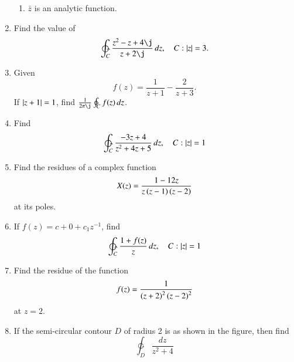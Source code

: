 \documentclass[journal,12pt,twocolumn]{IEEEtran}
\begin{document}
\begin{enumerate}[1.]
\begin{enumerate}
\item $\bar{z}$ is an analytic function.
\end{enumerate}
\item Find the value of 
\begin{equation}
\ointctrclockwise_{C}\frac{z^2-z+4\j}{z+2\j}\,dz, \quad C:\abs{z} = 3.
\end{equation}
\item Given 
\begin{equation}
f(z) = \frac{1}{z+1}-\frac{2}{z+3}.
\end{equation}
%
If $\left\vert z+1\right\vert = 1 $, find $\frac{1}{2\pi\j}\ointctrclockwise_{C}f(z)\,dz$.
\item Find 
\begin{equation}
\ointctrclockwise_{C}\frac{-3z+4}{z^2+4z+5}\,dz, \quad C:\abs{z} = 1
\end{equation}
\item Find the residues of a complex function 
\begin{equation}
X(z) = \frac{1-12z}{z\left(z-1\right)\left(z-2\right)}
\end{equation}
at its poles.
\item If $f(z) = c+0+c_1z^{-1}$, find
\begin{equation}
\ointctrclockwise_{C}\frac{1+f(z)}{z}\,dz, \quad C: \abs{z} = 1
\end{equation} 
\item Find the residue of the function
\begin{equation}
f(z) = \frac{1}{\left(z+2\right)^2\left(z-2\right)^2}
\end{equation}
at $z = 2$.
\item If the semi-circular contour $D$ of radius 2 is as shown in the figure, then find
\begin{equation}
\ointctrclockwise_{D}\frac{dz}{z^2+4}
\end{equation}


\end{enumerate}
\end{document}
